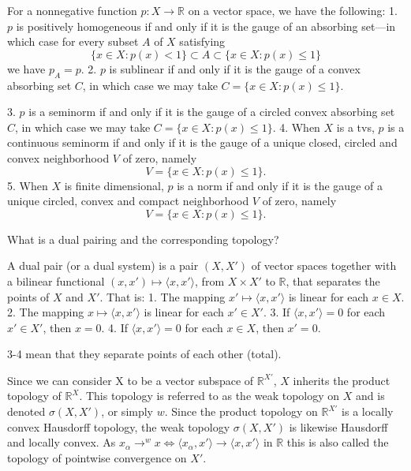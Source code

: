 For a nonnegative function \( p : X \to \mathbb{R} \) on a vector space, we have the following:
1. \( p \) is positively homogeneous if and only if it is the gauge of an absorbing set—in which case for every subset \( A \) of \( X \) satisfying  
   \[
   \{ x \in X : p(x) < 1 \} \subset A \subset \{ x \in X : p(x) \leq 1 \}
   \]  
   we have \( p_A = p \).
2. \( p \) is sublinear if and only if it is the gauge of a convex absorbing set \( C \), in which case we may take \( C = \{ x \in X : p(x) \leq 1 \} \).

3. \( p \) is a seminorm if and only if it is the gauge of a circled convex absorbing set \( C \), in which case we may take \( C = \{ x \in X : p(x) \leq 1 \} \).
4. When \( X \) is a tvs, \( p \) is a continuous seminorm if and only if it is the gauge of a unique closed, circled and convex neighborhood \( V \) of zero, namely  
   \[
   V = \{ x \in X : p(x) \leq 1 \}.
   \]
5. When \( X \) is finite dimensional, \( p \) is a norm if and only if it is the gauge of a unique circled, convex and compact neighborhood \( V \) of zero, namely  
   \[
   V = \{ x \in X : p(x) \leq 1 \}.
   \]



What is a dual pairing and the corresponding topology?

A dual pair (or a dual system) is a pair \((X, X')\) of vector spaces together with a bilinear functional \((x, x') \mapsto \langle x, x' \rangle\), from \(X \times X'\) to \(\mathbb{R}\), that separates the points of \(X\) and \(X'\). That is:
1. The mapping \(x' \mapsto \langle x, x' \rangle\) is linear for each \(x \in X\).
2. The mapping \(x \mapsto \langle x, x' \rangle\) is linear for each \(x' \in X'\).
3. If \(\langle x, x' \rangle = 0\) for each \(x' \in X'\), then \(x = 0\).
4. If \(\langle x, x' \rangle = 0\) for each \(x \in X\), then \(x' = 0\).

3-4 mean that they separate points of each other (total).

Since we can consider X to be a vector subspace of \( \mathbb{R}^{X'} \), \( X \)  inherits the product topology of \( \mathbb{R}^X \). 
This topology is referred to as the weak topology on \( X \) and is denoted \( \sigma(X, X') \), 
or simply \( w \). Since the product topology on \( \mathbb{R}^{X'} \) is a locally
convex Hausdorff topology, the weak topology \( \sigma(X, X') \) is likewise Hausdorff and locally convex.
As \( x_{\alpha} \to^{w} x \iff \langle x_{\alpha}, x' \rangle \to \langle x, x' \rangle \) in \( \mathbb{R} \)
this is also called the topology of pointwise convergence on \( X' \).

